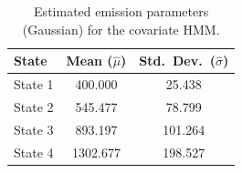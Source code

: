 \begin{table}[ht]
\centering
\begin{tabular}{lcc}
\hline
State & Mean ($\hat{\mu}$) & Std.\ Dev.\ ($\hat{\sigma}$) \\
\hline
State 1 & 400.000 & 25.438 \\
State 2 & 545.477 & 78.799 \\
State 3 & 893.197 & 101.264 \\
State 4 & 1302.677 & 198.527 \\
\hline
\end{tabular}
\caption{Estimated emission parameters (Gaussian) for the covariate HMM.}
\label{tab:covariate_hmm_emissions}
\end{table}
